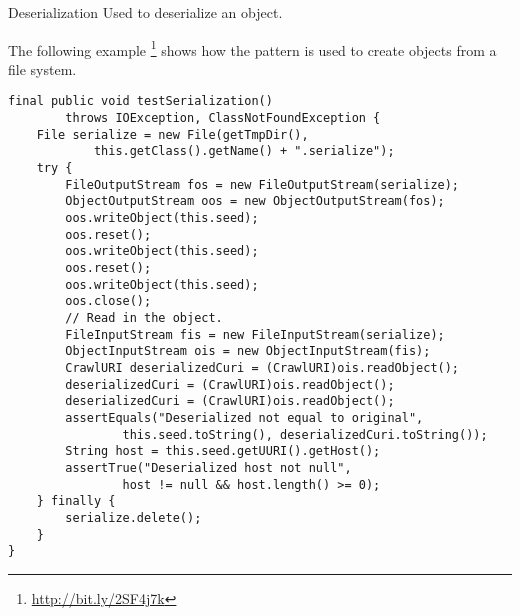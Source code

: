 \begin{pattern}{Deserialization}
Used to deserialize an object.

\instances{}
The following example%
\footnote{\url{http://bit.ly/2SF4j7k}}
shows how the \thisp{} pattern is used to create objects from a file system.

\begin{verbatim}
final public void testSerialization()
        throws IOException, ClassNotFoundException {
    File serialize = new File(getTmpDir(),
            this.getClass().getName() + ".serialize");
    try {
        FileOutputStream fos = new FileOutputStream(serialize);
        ObjectOutputStream oos = new ObjectOutputStream(fos);
        oos.writeObject(this.seed);
        oos.reset();
        oos.writeObject(this.seed);
        oos.reset();
        oos.writeObject(this.seed);
        oos.close();
        // Read in the object.
        FileInputStream fis = new FileInputStream(serialize);
        ObjectInputStream ois = new ObjectInputStream(fis);
        CrawlURI deserializedCuri = (CrawlURI)ois.readObject();
        deserializedCuri = (CrawlURI)ois.readObject();
        deserializedCuri = (CrawlURI)ois.readObject();
        assertEquals("Deserialized not equal to original",
                this.seed.toString(), deserializedCuri.toString());
        String host = this.seed.getUURI().getHost();
        assertTrue("Deserialized host not null",
                host != null && host.length() >= 0);
    } finally {
        serialize.delete();
    }
}
\end{verbatim}

\detection{}

\discussion{}

\related{}

\end{pattern}